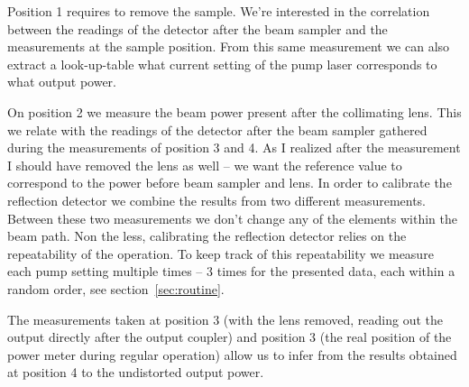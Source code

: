 Position 1 requires to remove the sample.
We're interested in the correlation between the readings
of the detector after the beam sampler
and the measurements at the sample position.
From this same measurement we can also extract
a look-up-table what current setting of the pump laser
corresponds to what output power.

On position 2 we measure the beam power present after the collimating lens.
This we relate with the readings of the detector after the beam sampler
gathered during the measurements of position 3 and 4.
As I realized after the measurement I should have removed the lens as well --
we want the reference value to correspond
to the power before beam sampler
and lens.
In order to calibrate the reflection detector
we combine the results from two different measurements.
Between these two measurements we don't change
any of the elements within the beam path.
Non the less,
calibrating the reflection detector
relies on the repeatability of the operation.
To keep track of this repeatability
we measure each pump setting
multiple times --
3 times for the presented data,
each within a random order,
see section~\ref{sec:routine}.

The measurements taken at position 3
(with the lens removed,
reading out the output directly after the output coupler)
and position 3
(the real position of the power meter during regular operation)
allow us to infer from the results obtained
at position 4 to the undistorted output power.



